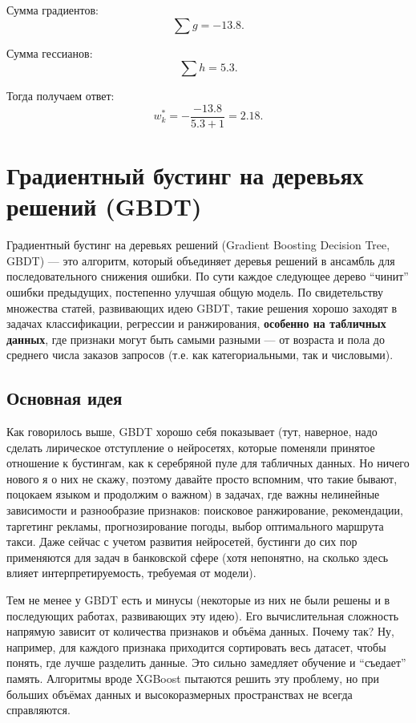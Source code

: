 Сумма градиентов:
\[
    \sum g = -13.8.
\]

Сумма гессианов:
\[
    \sum h = 5.3.
\]

Тогда получаем ответ:
\[
    w_k^* = -\frac{-13.8}{5.3 + 1} = 2.18.
\]

\section*{Градиентный бустинг на деревьях решений (GBDT)}

Градиентный бустинг на деревьях решений (Gradient Boosting Decision Tree, GBDT) — это алгоритм, который объединяет деревья решений в ансамбль для последовательного снижения ошибки. По сути каждое следующее дерево ``чинит''  ошибки предыдущих, постепенно улучшая общую модель. По свидетельству множества статей, развивающих идею GBDT, такие решения хорошо заходят в задачах классификации, регрессии и ранжирования, \textbf{особенно на табличных данных}, где признаки могут быть самыми разными — от возраста и пола до среднего числа заказов запросов (т.е. как категориальными, так и числовыми).

\subsection*{Основная идея}

Как говорилось выше, GBDT хорошо себя показывает (тут, наверное, надо сделать лирическое отступление о нейросетях, которые поменяли принятое отношение к бустингам, как к серебряной пуле для табличных данных. Но ничего нового я о них не скажу, поэтому давайте просто вспомним, что такие бывают, поцокаем языком и продолжим о важном) в задачах, где важны нелинейные зависимости и разнообразие признаков: поисковое ранжирование, рекомендации, таргетинг рекламы, прогнозирование погоды, выбор оптимального маршрута такси. Даже сейчас с учетом развития нейросетей, бустинги до сих пор применяются для задач в банковской сфере (хотя непонятно, на сколько здесь влияет интерпретируемость, требуемая от модели).

Тем не менее у GBDT есть и минусы (некоторые из них не были решены и в последующих работах, развивающих эту идею). Его вычислительная сложность напрямую зависит от количества признаков и объёма данных. Почему так? Ну, например, для каждого признака приходится сортировать весь датасет, чтобы понять, где лучше разделить данные. Это сильно замедляет обучение и ``съедает'' память. Алгоритмы вроде XGBoost пытаются решить эту проблему, но при больших объёмах данных и высокоразмерных пространствах не всегда справляются.

